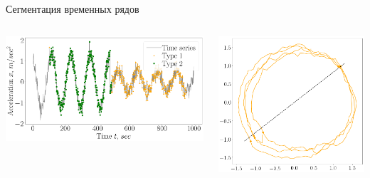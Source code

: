 \documentclass[10pt,pdf,hyperref={unicode}]{beamer}
\begin{document}
\begin{frame}[shrink=5]{Сегментация временных рядов}

\begin{columns}
    \begin{column}{0.5\textwidth}
        \includegraphics[width=1\textwidth]{results/simple_1_claster_vector}
    \end{column}
    \begin{column}{0.3\textwidth}
        \includegraphics[width=1\textwidth]{results/simple_1_phase_space0}
    \end{column}
\end{columns}


\end{frame}
\end{document}
